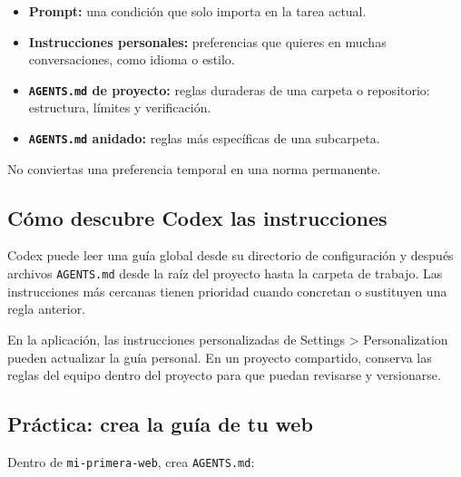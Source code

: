 \documentclass[10pt,a4paper,openany]{book}
\providecommand{\tightlist}{\setlength{\itemsep}{0.18em}\setlength{\parskip}{0pt}}
\begin{document}
\begin{itemize}
\tightlist
\item
  \textbf{Prompt:} una condición que solo importa en la tarea actual.
\item
  \textbf{Instrucciones personales:} preferencias que quieres en muchas
  conversaciones, como idioma o estilo.
\item
  \textbf{\texttt{AGENTS.md} de proyecto:} reglas duraderas de una
  carpeta o repositorio: estructura, límites y verificación.
\item
  \textbf{\texttt{AGENTS.md} anidado:} reglas más específicas de una
  subcarpeta.
\end{itemize}

No conviertas una preferencia temporal en una norma permanente.

\subsection{Cómo descubre Codex las
instrucciones}\label{cuxf3mo-descubre-codex-las-instrucciones}

Codex puede leer una guía global desde su directorio de configuración y
después archivos \texttt{AGENTS.md} desde la raíz del proyecto hasta la
carpeta de trabajo. Las instrucciones más cercanas tienen prioridad
cuando concretan o sustituyen una regla anterior.

En la aplicación, las instrucciones personalizadas de Settings
\textgreater{} Personalization pueden actualizar la guía personal. En un
proyecto compartido, conserva las reglas del equipo dentro del proyecto
para que puedan revisarse y versionarse.

\subsection{Práctica: crea la guía de tu
web}\label{pruxe1ctica-crea-la-guuxeda-de-tu-web}

Dentro de \texttt{mi-primera-web}, crea \texttt{AGENTS.md}:
\end{document}
